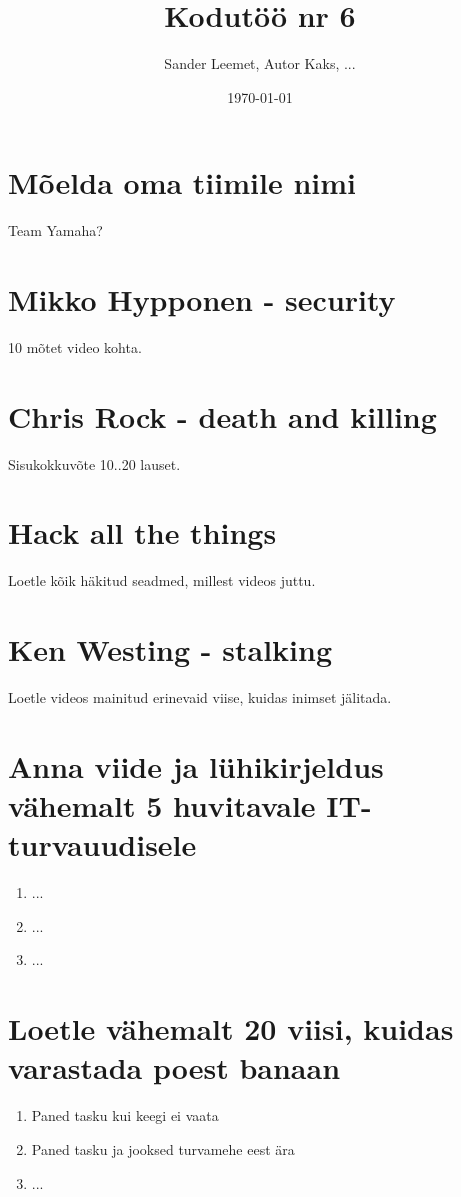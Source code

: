\documentclass{article}
\title{Kodutöö nr 6}
\author{Sander Leemet, Autor Kaks, ...}
\date{\today}
\begin{document}
\maketitle

\section{Mõelda oma tiimile nimi}
Team Yamaha?

\section{Mikko Hypponen - security}
10 mõtet video kohta.

\section{Chris Rock - death and killing}
Sisukokkuvõte 10..20 lauset.

\section{Hack all the things}
Loetle kõik häkitud seadmed, millest videos juttu.

\section{Ken Westing - stalking}
Loetle videos mainitud erinevaid viise, kuidas inimset jälitada.

\section{Anna viide ja lühikirjeldus vähemalt 5 huvitavale IT-turvauudisele}
\begin{enumerate}
	\item{...}
	\item{...}
	\item{...}
\end{enumerate}

\section{Loetle vähemalt 20 viisi, kuidas varastada poest banaan}
\begin{enumerate}
	\item{Paned tasku kui keegi ei vaata}
	\item{Paned tasku ja jooksed turvamehe eest ära}
	\item{...}
\end{enumerate}
\end{document}
